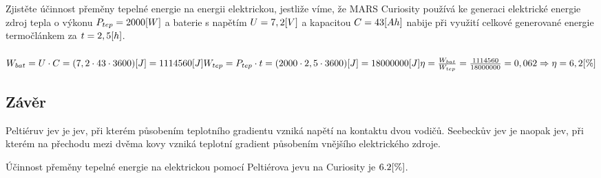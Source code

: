 \documentclass{article}
\begin{document}
\newpage
Zjistěte účinnost přeměny tepelné energie na energii elektrickou, jestliže víme, že MARS Curiosity používá ke generaci elektrické energie zdroj tepla o výkonu \(P_{tep} = 2000\-[W]\) a baterie s napětím \(U = 7,2\-[V]\) 
  a kapacitou \(C = 43\-[Ah]\) nabije při využití celkové generované energie termočlánkem za \(t = 2,5\-[h]\).\\
\\
\large
\(
  W_{bat} = U\cdot C = (7,2 \cdot 43 \cdot 3600)\-[J] = 1114560\-[J] \\ \\
  W_{tep} = P_{tep} \cdot t = (2000 \cdot 2,5 \cdot 3600)\-[J] = 18000000\-[J] \\ \\
  \eta = \frac{W_{bat}}{W_{tep}} = \frac{1114560}{18000000} = 0,062 \Rightarrow \eta = 6,2\-[\%] \\ \\
\)
\normalsize \\


\subsection{Závěr}
Peltiéruv jev je jev, při kterém působením teplotního gradientu vzniká napětí na kontaktu dvou vodičů. Seebeckův jev je naopak jev, při kterém na přechodu mezi dvěma kovy vzniká teplotní gradient působením vnějšího elektrického zdroje.

Účinnost přeměny tepelné energie na elektrickou pomocí Peltiérova jevu na Curiosity je \(6.2\-[\%]\).
\end{document}
